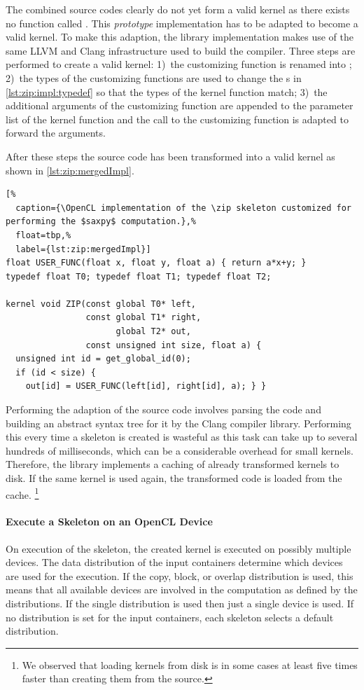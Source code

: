 The combined source codes clearly do not yet form a valid \OpenCL kernel as there exists no function called .
This \emph{prototype} implementation has to be adapted to become a valid \OpenCL kernel.
To make this adaption, the \SkelCL library implementation makes use of the same LLVM and Clang infrastructure used to build the  compiler.
Three steps are performed to create a valid \OpenCL kernel:
1)~the customizing function is renamed into ;
2)~the types of the customizing functions are used to change the s in \autoref{lst:zip:impl:typedef} so that the types of the kernel function  match;
3)~the additional arguments of the customizing function are appended to the parameter list of the kernel function  and the call to the customizing function is adapted to forward the arguments.

After these steps the source code has been transformed into a valid \OpenCL kernel as shown in \autoref{lst:zip:mergedImpl}.
\begin{lstlisting}[%
  caption={\OpenCL implementation of the \zip skeleton customized for performing the $saxpy$ computation.},%
  float=tbp,%
  label={lst:zip:mergedImpl}]
float USER_FUNC(float x, float y, float a) { return a*x+y; }
typedef float T0; typedef float T1; typedef float T2;

kernel void ZIP(const global T0* left,
                const global T1* right,
                      global T2* out,
                const unsigned int size, float a) {
  unsigned int id = get_global_id(0);
  if (id < size) {
    out[id] = USER_FUNC(left[id], right[id], a); } }
\end{lstlisting}

Performing the adaption of the source code involves parsing the code and building an abstract syntax tree for it by the Clang compiler library.
Performing this every time a skeleton is created is wasteful as this task can take up to several hundreds of milliseconds, which can be a considerable overhead for small kernels.
Therefore, the \SkelCL library implements a caching of already transformed kernels to disk.
If the same kernel is used again, the transformed code is loaded from the cache.%
\footnote{We observed that loading kernels from disk is in some cases at least five times faster than creating them from the source.}


\paragraph{Execute a Skeleton on an OpenCL Device}
On execution of the skeleton, the created \OpenCL kernel is executed on possibly multiple \OpenCL devices.
The data distribution of the input containers determine which \OpenCL devices are used for the execution.
If the copy, block, or overlap distribution is used, this means that all available devices are involved in the computation as defined by the distributions.
If the single distribution is used then just a single device is used.
If no distribution is set for the input containers, each skeleton selects a default distribution.

